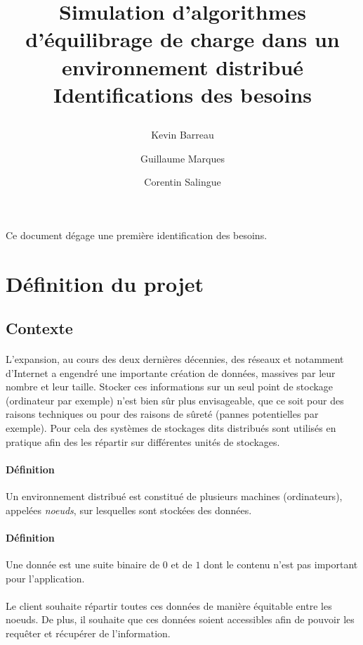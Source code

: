\documentclass[12pt]{article}
\title{
 \begin{minipage}\linewidth
        \centering
        Simulation d'algorithmes d'équilibrage de charge dans un environnement distribué 
        \vskip3pt
        \large Identifications des besoins
    \end{minipage}
 }
\author{Kevin Barreau \and Guillaume Marques \and Corentin Salingue}
\begin{document}
\maketitle

\abstract
Ce document dégage une première identification des besoins.



\newpage


\renewcommand{\contentsname}{Sommaire} 
\tableofcontents



\newpage

\section{Définition du projet}

\subsection{Contexte}

\paragraph{} L'expansion, au cours des deux dernières décennies, des réseaux et notamment d'Internet a engendré une importante création de données, massives par leur nombre et leur taille.
Stocker ces informations sur un seul point de stockage (ordinateur par exemple) n'est bien sûr plus envisageable, que ce soit pour des raisons techniques ou pour des raisons de sûreté (pannes potentielles par exemple).
Pour cela des systèmes de stockages dits distribués sont utilisés en pratique afin des les répartir sur différentes unités de stockages.

\paragraph{Définition} Un environnement distribué est constitué de plusieurs machines (ordinateurs), appelées \textit{noeuds}, sur lesquelles sont stockées des données.

\paragraph{Définition} Une donnée est une suite binaire de $0$ et de $1$ dont le contenu n'est pas important pour l'application.

\paragraph{} Le client souhaite répartir toutes ces données de manière équitable entre les noeuds. De plus, il souhaite que ces données soient accessibles afin de pouvoir les requêter et récupérer de l'information.
\end{document}
